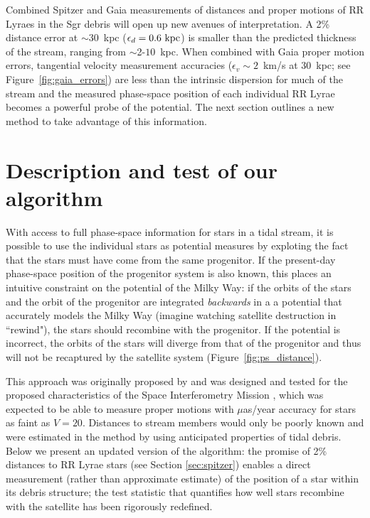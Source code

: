 \documentclass{emulateapj}
\begin{document}
Combined Spitzer and Gaia measurements of distances and proper motions
of RR Lyraes in the Sgr debris will open up new avenues of
interpretation. A 2\% distance error at $\sim$30~kpc
($\epsilon_{d}=0.6~{\rm kpc}$) is smaller than the predicted thickness
of the stream, ranging from $\sim$2-$10$~kpc. When combined with Gaia proper motion errors,
tangential velocity measurement accuracies ($\epsilon_{v}\sim2$~km/s
at 30~kpc; see Figure~\ref{fig:gaia_errors}) are less than the intrinsic dispersion for much of the stream
\citep[$\sigma_v\sim10$~km/s;][]{majewski04} and the measured phase-space position of each individual RR
Lyrae becomes a powerful probe of the potential. The next section
outlines a new method to take advantage of this information.

\section{Description and test of our algorithm}
\label{sec:method}
With access to full phase-space information for stars in a tidal
stream, it is possible to use the individual stars as potential
measures by exploting the fact that the stars must have come from the
same progenitor. If the present-day phase-space position of the
progenitor system is also known, this places an intuitive constraint
on the potential of the Milky Way: if the orbits of the stars and the
orbit of the progenitor are integrated \emph{backwards} in a a potential that accurately models the Milky Way
(imagine watching satellite destruction in ``rewind"), the stars
should recombine with the progenitor. If the potential is incorrect,
the orbits of the stars will diverge from that of the progenitor and
thus will not be recaptured by the satellite system
(Figure~\ref{fig:ps_distance}).

This approach was originally proposed by \citet{johnston99a} and was
designed and tested for the proposed characteristics of the Space
Interferometry Mission \citep{unwin08}, which was expected to be able
to measure proper motions with $\mu$as/year accuracy for stars as
faint as $V=20$. Distances to stream members would only be poorly
known and were estimated in the method by using anticipated properties
of tidal debris. Below we present an updated version of the algorithm:
the promise of 2\% distances to RR Lyrae stars (see Section
\ref{sec:spitzer}) enables a direct measurement (rather than
approximate estimate) of the position of a star within its debris
structure; the test statistic that quantifies how well stars recombine
with the satellite has been rigorously redefined.
\end{document}
